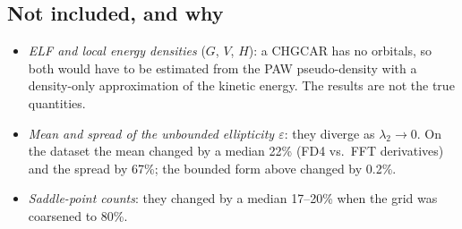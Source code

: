 \documentclass[11pt,a4paper]{article}
\begin{document}
\subsection*{Not included, and why}\label{sec:dropped}
\begin{itemize}[leftmargin=1.4em,itemsep=0.3ex,topsep=0.3ex]
\item \emph{ELF and local energy densities} ($G$, $V$, $H$): a CHGCAR has no orbitals, so both
  would have to be estimated from the PAW pseudo-density with a density-only approximation of the
  kinetic energy. The results are not the true quantities.
\item \emph{Mean and spread of the unbounded ellipticity $\varepsilon$}: they diverge as
  $\lambda_2\to0$. On the dataset the mean changed by a median 22\% (FD4 vs.\ FFT derivatives)
  and the spread by 67\%; the bounded form above changed by 0.2\%.
\item \emph{Saddle-point counts}: they changed by a median 17--20\% when the grid was coarsened
  to 80\%.
\end{itemize}
\end{document}

